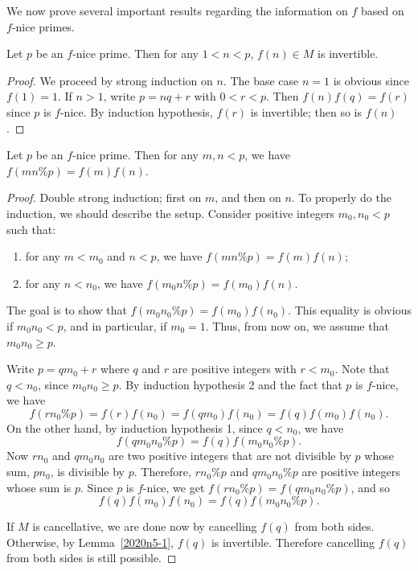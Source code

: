 We now prove several important results regarding the information on $f$ based on $f$-nice primes.

\begin{lemma}\label{2020n5-1}
Let $p$ be an $f$-nice prime.
Then for any $1 < n < p$, $f(n) \in M$ is invertible.
\end{lemma}
\begin{proof}
We proceed by strong induction on $n$.
The base case $n = 1$ is obvious since $f(1) = 1$.
If $n > 1$, write $p = nq + r$ with $0 < r < p$.
Then $f(n) f(q) = f(r)$ since $p$ is $f$-nice.
By induction hypothesis, $f(r)$ is invertible; then so is $f(n)$.
\end{proof}

\begin{lemma}\label{2020n5-2}
Let $p$ be an $f$-nice prime.
Then for any $m, n < p$, we have $f(mn \% p) = f(m) f(n)$.
\end{lemma}
\begin{proof}
Double strong induction; first on $m$, and then on $n$.
To properly do the induction, we should describe the setup.
Consider positive integers $m_0, n_0 < p$ such that:
\begin{enumerate}
    \item   for any $m < m_0$ and $n < p$, we have $f(mn \% p) = f(m) f(n)$;
    \item   for any $n < n_0$, we have $f(m_0 n \% p) = f(m_0) f(n)$.
\end{enumerate}
The goal is to show that $f(m_0 n_0 \% p) = f(m_0) f(n_0)$.
This equality is obvious if $m_0 n_0 < p$, and in particular, if $m_0 = 1$.
Thus, from now on, we assume that $m_0 n_0 \geq p$.

Write $p = qm_0 + r$ where $q$ and $r$ are positive integers with $r < m_0$.
Note that $q < n_0$, since $m_0 n_0 \geq p$.
By induction hypothesis 2 and the fact that $p$ is $f$-nice, we have
\[ f(r n_0 \% p) = f(r) f(n_0) = f(qm_0) f(n_0) = f(q) f(m_0) f(n_0). \]
On the other hand, by induction hypothesis 1, since $q < n_0$, we have
\[ f(qm_0 n_0 \% p) = f(q) f(m_0 n_0 \% p). \]
Now $r n_0$ and $qm_0 n_0$ are two positive integers that are not divisible by $p$ whose sum, $p n_0$, is divisible by $p$.
Therefore, $r n_0 \% p$ and $qm_0 n_0 \% p$ are positive integers whose sum is $p$.
Since $p$ is $f$-nice, we get $f(r n_0 \% p) = f(qm_0 n_0 \% p)$, and so
\[ f(q) f(m_0) f(n_0) = f(q) f(m_0 n_0 \% p). \]

If $M$ is cancellative, we are done now by cancelling $f(q)$ from both sides.
Otherwise, by Lemma~\ref{2020n5-1}, $f(q)$ is invertible.
Therefore cancelling $f(q)$ from both sides is still possible.
\end{proof}

